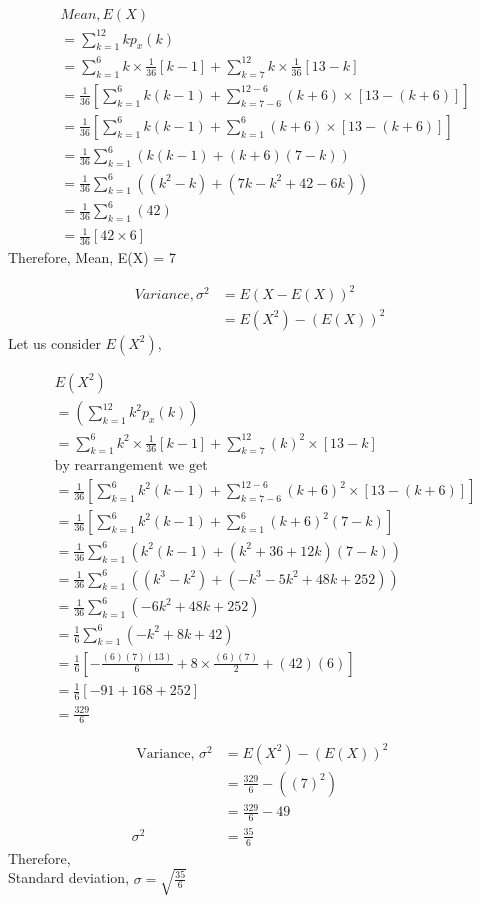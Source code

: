 \documentclass[journal,12pt,twocolumn]{IEEEtran}
\begin{document}
\allowdisplaybreaks
\begin{align}
    &Mean,E(X)\\
    & =\sum_{k=1}^{12} kp_x(k)\\
    & = \sum_{k=1}^{6}k\times\frac{1}{36}[k-1] + \sum_{k=7}^{12}k\times\frac{1}{36}[13-k]\\
    & = \frac{1}{36}\left[\sum_{k=1}^{6}k(k-1) + \sum_{k=7-6}^{12-6}(k+6)\times[13-(k+6)]\right]\\
    & = \frac{1}{36}\left[\sum_{k=1}^{6}k(k-1) + \sum_{k=1}^{6}(k+6)\times[13-(k+6)]\right]\\
    &= \frac{1}{36}\sum_{k=1}^{6}\left(k(k-1) + (k+6)(7-k)\right)\\
    &= \frac{1}{36}\sum_{k=1}^{6}\left((k^2- k)+ (7k-k^2+42-6k)\right)\\
    &= \frac{1}{36}\sum_{k=1}^{6}\left( 42\right)\\
    &= \frac{1}{36}\left[ 42 \times 6 \right]
\end{align}
Therefore,
 Mean, E(X) = 7
 
\begin{align}
  Variance,\sigma^2 &= E(X-E(X))^2 \\
    &= E(X^2) - (E(X))^2
\end{align}
Let us consider $E(X^2)$,

\allowdisplaybreaks
\begin{align}
    & E(X^2)\\
    &= \left(\sum_{k=1}^{12}k^2p_x(k)\right)\\
    &= \sum_{k=1}^{6}k^2\times\frac{1}{36}[k-1] + 
    \sum_{k=7}^{12}(k)^2\times[13-k]\\
    &\text{by rearrangement we get}\\
    &= \frac{1}{36}\left[\sum_{k=1}^{6}k^2(k-1) + \sum_{k=7-6}^{12-6}(k+6)^2\times[13-(k+6)]\right]\\
    &= \frac{1}{36}\left[\sum_{k=1}^{6}k^2(k-1) + \sum_{k=1}^{6}(k+6)^2(7-k)\right]\\
    &= \frac{1}{36}\sum_{k=1}^{6}\left(k^2(k-1) + (k^2+36+12k)(7-k)\right)\\
    &= \frac{1}{36}\sum_{k=1}^{6}\left((k^3-k^2) + (-k^3-5k^2+48k+252)\right)\\
    &= \frac{1}{36}\sum_{k=1}^{6}(-6k^2+48k+252)\\
    &= \frac{1}{6}\sum_{k=1}^{6}(-k^2+8k+42)\\
    &= \frac{1}{6}\left[ -\frac{(6)(7)(13)}{6} + 8\times\frac{(6)(7)}{2}+ (42)(6) \right]\\
    &= \displaystyle\frac{1}{6}[-91+168+252]\\
    &= \displaystyle\frac{329}{6}
\end{align}

\begin{align}
    \text{ Variance, }\sigma^2 &= E(X^2)-(E(X))^2\\
    &= \displaystyle\frac{329}{6}- ((7)^2)\\
    &= \displaystyle\frac{329}{6} - 49\\
   \sigma^2 &= \displaystyle\frac{35}{6}
\end{align}
Therefore,\\
Standard deviation, $\sigma=\sqrt{\displaystyle\frac{35}{6}}$
\end{document}
